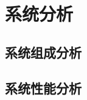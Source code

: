 \label{subsec:system flow}
\begin{figure}[!htp]
    \centering
    \resizebox{14cm}{!}{}
\end{figure}


\section{系统分析}
\label{sec:system analysis}

\subsection{系统组成分析}
\label{subsec:component analysis}

\subsection{系统性能分析}
\label{subsec:performance analysis}

